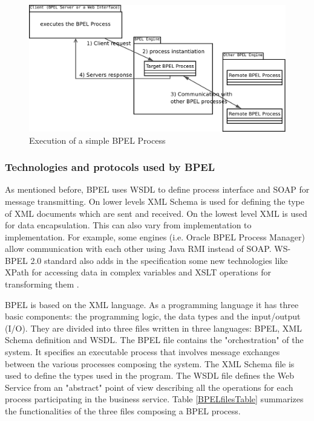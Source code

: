 \begin{figure}
\begin{center}
\includegraphics[width=125mm]{pictures/image-BPEL.pdf}
\caption{Execution of a simple BPEL Process}
\label{BPELprocess}
\end{center}
\end{figure}

\subsubsection{Technologies and protocols used by BPEL}
As mentioned before, BPEL uses WSDL to define process interface and SOAP for message transmitting. On lower levels XML Schema is used for defining the type of XML documents which are sent and received. On the lowest level XML is used for data encapsulation. This can also vary from implementation to implementation. For example, some engines (i.e. Oracle BPEL Process Manager) allow communication with each other using Java RMI instead of SOAP. WS-BPEL 2.0 standard also adds in the specification some new technologies like XPath for accessing data in complex variables and XSLT operations for transforming them \cite{OraBPELRMIInvocation}.


\label{BPELfiles}
BPEL is based on the XML language. As a programming language it has three basic components: the programming logic, the data types and the input/output (I/O). They are divided into three files written in three languages: BPEL, XML Schema definition and WSDL. 
The BPEL file contains the "orchestration" of the system. It specifies an executable process that involves message exchanges between the various processes composing the system. The XML Schema file is used to define the types used in the program. The WSDL file defines the Web Service from an "abstract" point of view describing all the operations for each process participating in the business service.
Table \ref{BPELfilesTable} summarizes the functionalities of the three files composing a BPEL process.

